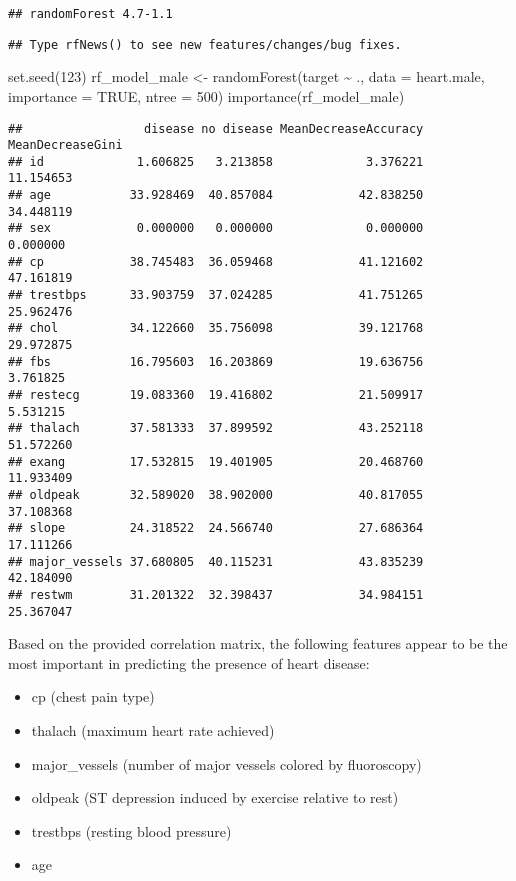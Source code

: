 \documentclass[
]{article}
\newenvironment{Shaded}{\begin{snugshade}}{\end{snugshade}}
\newcommand{\AttributeTok}[1]{\textcolor[rgb]{0.77,0.63,0.00}{#1}}
\newcommand{\ConstantTok}[1]{\textcolor[rgb]{0.00,0.00,0.00}{#1}}
\newcommand{\DecValTok}[1]{\textcolor[rgb]{0.00,0.00,0.81}{#1}}
\newcommand{\FunctionTok}[1]{\textcolor[rgb]{0.00,0.00,0.00}{#1}}
\newcommand{\NormalTok}[1]{#1}
\newcommand{\OtherTok}[1]{\textcolor[rgb]{0.56,0.35,0.01}{#1}}
\newcommand{\SpecialCharTok}[1]{\textcolor[rgb]{0.00,0.00,0.00}{#1}}
\providecommand{\tightlist}{%
  \setlength{\itemsep}{0pt}\setlength{\parskip}{0pt}}
\begin{document}
\begin{verbatim}
## randomForest 4.7-1.1
\end{verbatim}

\begin{verbatim}
## Type rfNews() to see new features/changes/bug fixes.
\end{verbatim}

\begin{Shaded}
\begin{Highlighting}[]
\FunctionTok{set.seed}\NormalTok{(}\DecValTok{123}\NormalTok{)}
\NormalTok{rf\_model\_male }\OtherTok{\textless{}{-}} \FunctionTok{randomForest}\NormalTok{(target }\SpecialCharTok{\textasciitilde{}}\NormalTok{ ., }\AttributeTok{data =}\NormalTok{ heart.male, }\AttributeTok{importance =} \ConstantTok{TRUE}\NormalTok{, }\AttributeTok{ntree =} \DecValTok{500}\NormalTok{)}
\FunctionTok{importance}\NormalTok{(rf\_model\_male)}
\end{Highlighting}
\end{Shaded}

\begin{verbatim}
##                 disease no disease MeanDecreaseAccuracy MeanDecreaseGini
## id             1.606825   3.213858             3.376221        11.154653
## age           33.928469  40.857084            42.838250        34.448119
## sex            0.000000   0.000000             0.000000         0.000000
## cp            38.745483  36.059468            41.121602        47.161819
## trestbps      33.903759  37.024285            41.751265        25.962476
## chol          34.122660  35.756098            39.121768        29.972875
## fbs           16.795603  16.203869            19.636756         3.761825
## restecg       19.083360  19.416802            21.509917         5.531215
## thalach       37.581333  37.899592            43.252118        51.572260
## exang         17.532815  19.401905            20.468760        11.933409
## oldpeak       32.589020  38.902000            40.817055        37.108368
## slope         24.318522  24.566740            27.686364        17.111266
## major_vessels 37.680805  40.115231            43.835239        42.184090
## restwm        31.201322  32.398437            34.984151        25.367047
\end{verbatim}

Based on the provided correlation matrix, the following features appear
to be the most important in predicting the presence of heart disease:

\begin{itemize}
\tightlist
\item
  cp (chest pain type)
\item
  thalach (maximum heart rate achieved)
\item
  major\_vessels (number of major vessels colored by fluoroscopy)
\item
  oldpeak (ST depression induced by exercise relative to rest)
\item
  trestbps (resting blood pressure)
\item
  age
\end{itemize}
\end{document}
